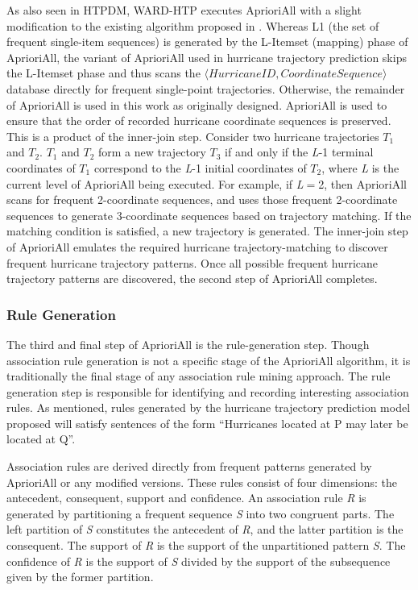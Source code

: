 \documentclass[12pt,conference]{IEEEtran}
\begin{document}
As also seen in HTPDM, WARD-HTP executes AprioriAll with a slight modification to the existing algorithm proposed in \cite{AprioriAll-original}. Whereas L1 (the set of frequent single-item sequences) is generated by the L-Itemset (mapping) phase of AprioriAll, the variant of AprioriAll used in hurricane trajectory prediction skips the L-Itemset phase and thus scans the $\langle HurricaneID, CoordinateSequence\rangle$ database directly for frequent single-point trajectories. Otherwise, the remainder of AprioriAll is used in this work as originally designed. AprioriAll is used to ensure that the order of recorded hurricane coordinate sequences is preserved. This is a product of the inner-join step. Consider two hurricane trajectories $T_{1}$ and $T_{2}$. $T_{1}$ and $T_{2}$ form a new trajectory $T_{3}$ if and only if the \textit{L}-1 terminal coordinates of $T_{1}$ correspond to the \textit{L}-1 initial coordinates of $T_{2}$, where \textit{L} is the current level of AprioriAll being executed. For example, if \textit{L}$=$2, then AprioriAll scans for frequent 2-coordinate sequences, and uses those frequent 2-coordinate sequences to generate 3-coordinate sequences based on trajectory matching. If the matching condition is satisfied, a new trajectory is generated. The inner-join step of AprioriAll emulates the required hurricane trajectory-matching to discover frequent hurricane trajectory patterns. Once all possible frequent hurricane trajectory patterns are discovered, the second step of AprioriAll completes.

\subsubsection{Rule Generation}

The third and final step of AprioriAll is the rule-generation step. Though association rule generation is not a specific stage of the AprioriAll algorithm, it is traditionally the final stage of any association rule mining approach. The rule generation step is responsible for identifying and recording interesting association rules. As mentioned, rules generated by the hurricane trajectory prediction model proposed will satisfy sentences of the form ``Hurricanes located at P may later be located at Q''. 

Association rules are derived directly from frequent patterns generated by AprioriAll or any modified versions. These rules consist of four dimensions: the antecedent, consequent, support and confidence. An association rule \textit{R} is generated by partitioning a frequent sequence \textit{S} into two congruent parts. The left partition of \textit{S} constitutes the antecedent of \textit{R}, and the latter partition is the consequent. The support of \textit{R} is the support of the unpartitioned pattern \textit{S}. The confidence of \textit{R} is the support of \textit{S} divided by the support of the subsequence given by the former partition. 
\end{document}
